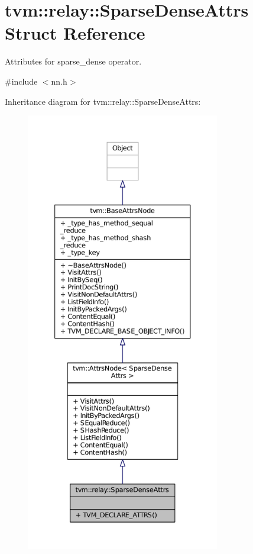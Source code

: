 \hypertarget{structtvm_1_1relay_1_1SparseDenseAttrs}{}\section{tvm\+:\+:relay\+:\+:Sparse\+Dense\+Attrs Struct Reference}
\label{structtvm_1_1relay_1_1SparseDenseAttrs}


Attributes for sparse\+\_\+dense operator.  




{\ttfamily \#include $<$nn.\+h$>$}



Inheritance diagram for tvm\+:\+:relay\+:\+:Sparse\+Dense\+Attrs\+:
\nopagebreak
\begin{figure}[H]
\begin{center}
\leavevmode
\includegraphics[height=550pt]{structtvm_1_1relay_1_1SparseDenseAttrs__inherit__graph}
\end{center}
\end{figure}


